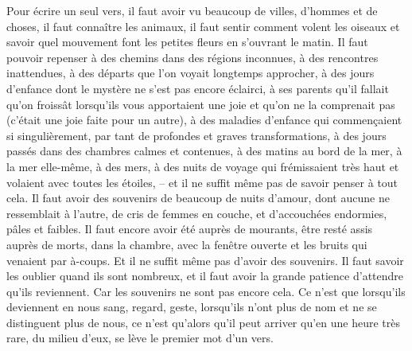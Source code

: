 	{Pour écrire un seul vers, il faut avoir vu beaucoup de villes, d’hommes et de choses, il faut connaître les animaux, il faut sentir comment volent les oiseaux et savoir quel mouvement font les petites fleurs en s’ouvrant le matin. Il faut pouvoir repenser à des chemins dans des régions inconnues, à des rencontres inattendues, à des départs que l’on voyait longtemps approcher, à des jours d’enfance dont le mystère ne s’est pas encore éclairci, à ses parents qu’il fallait qu’on froissât lorsqu’ils vous apportaient une joie et qu’on ne la comprenait pas (c’était une joie faite pour un autre), à des maladies d’enfance qui commençaient si singulièrement, par tant de profondes et graves transformations, à des jours passés dans des chambres calmes et contenues, à des matins au bord de la mer, à la mer elle-même, à des mers, à des nuits de voyage qui frémissaient très haut et volaient avec toutes les étoiles, – et il ne suffit même pas de savoir penser à tout cela. Il faut avoir des souvenirs de beaucoup de nuits d’amour, dont aucune ne ressemblait à l’autre, de cris de femmes en couche, et d’accouchées endormies, pâles et faibles. Il faut encore avoir été auprès de mourants, être resté assis auprès de morts, dans la chambre, avec la fenêtre ouverte et les bruits qui venaient par à-coups. Et il ne suffit même pas d’avoir des souvenirs. Il faut savoir les oublier quand ils sont nombreux, et il faut avoir la grande patience d’attendre qu’ils reviennent. Car les souvenirs ne sont pas encore cela. Ce n’est que lorsqu’ils deviennent en nous sang, regard, geste, lorsqu’ils n’ont plus de nom et ne se distinguent plus de nous, ce n’est qu’alors qu’il peut arriver qu’en une heure très rare, du milieu d’eux, se lève le premier mot d’un vers.
}

